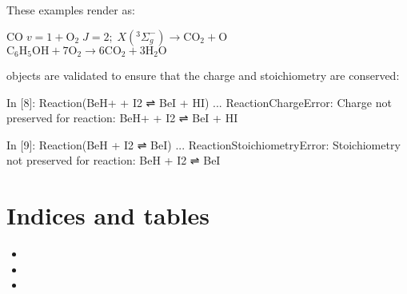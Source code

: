 \documentclass[letterpaper,10pt,english]{sphinxmanual}
\begin{document}
These examples render as:



$\mathrm{C}\mathrm{O} \; v=1 + \mathrm{O}_{2} \; J=2; \; X({}^{3}\Sigma^-_{g}) \rightarrow \mathrm{C}\mathrm{O}_{2} + \mathrm{O}$\\
$\mathrm{C}_{6}\mathrm{H}_{5}\mathrm{O}\mathrm{H} + 7\mathrm{O}_{2} \rightarrow 6\mathrm{C}\mathrm{O}_{2} + 3\mathrm{H}_{2}\mathrm{O}$

 objects are validated to ensure that the charge and stoichiometry are conserved:

\begin{sphinxVerbatim}[commandchars=\\\{\}]
In [8]: Reaction(\PYGZsq{}BeH+ + I2 ⇌ BeI + HI\PYGZsq{})
...
ReactionChargeError: Charge not preserved for reaction: BeH+ + I2 ⇌ BeI + HI

In [9]: Reaction(\PYGZsq{}BeH + I2 ⇌ BeI\PYGZsq{})
...
ReactionStoichiometryError: Stoichiometry not preserved for reaction: BeH + I2 ⇌ BeI
\end{sphinxVerbatim}


\chapter{Indices and tables}
\label{\detokenize{index:indices-and-tables}}\begin{itemize}
\item {} 

\item {} 

\item {} 

\end{itemize}



\renewcommand{\indexname}{Index}
\printindex
\end{document}
